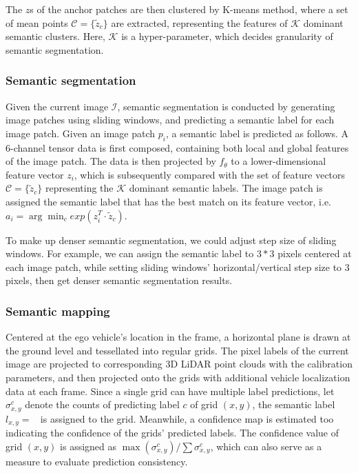 \documentclass[letterpaper, 10 pt, conference]{ieeeconf}  %
\begin{document}
The $z$s of the anchor patches are then clustered by K-means method, where a set of mean points $\mathcal{C}=\{\tilde{z}_c\}$ are extracted, representing the features of $\mathcal{K}$ dominant semantic clusters. Here, $\mathcal{K}$ is a hyper-parameter, which decides granularity of semantic segmentation.

\subsubsection{Semantic segmentation}

Given the current image $\mathcal{I}$, semantic segmentation is conducted by generating image patches using sliding windows, and predicting a semantic label for each image patch.
Given an image patch $p_i$, a semantic label is predicted as follows. A 6-channel tensor data is first composed, containing both local and global features of the image patch. The data is then projected by $f_{\theta}$ to a lower-dimensional feature vector $z_i$, which is subsequently compared with the set of feature vectors $\mathcal{C}=\{\tilde{z}_c\}$ representing the $\mathcal{K}$ dominant semantic labels. The image patch is assigned the semantic label that has the best match on its feature vector, i.e. $a_i = \arg\min_c exp(z_i^T \cdot \tilde{z}_c)$.

To make up denser semantic segmentation, we could adjust step size of sliding windows. For example, we can assign the semantic label to $3*3$ pixels centered at each image patch, while setting sliding windows' horizontal/vertical step size to 3 pixels, then get denser semantic segmentation results.

\subsubsection{Semantic mapping} \label{3_SM}

Centered at the ego vehicle's location in the frame, a horizontal plane is drawn at the ground level and tessellated into regular grids. The pixel labels of the current image are projected to corresponding 3D LiDAR point clouds with the calibration parameters, and then projected onto the grids with additional vehicle localization data at each frame. Since a single grid can have multiple label predictions, let $\sigma_{x,y}^c$ denote the counts of predicting label $c$ of grid $(x,y)$, the semantic label $l_{x,y}=\mathop{\text{argmax}_{c} (\sigma_{x,y}^c)}$ is assigned to the grid. Meanwhile, a confidence map is estimated too indicating the confidence of the grids' predicted labels. The confidence value of grid $(x,y)$ is assigned as $\max(\sigma_{x,y}^c)/\sum{\sigma_{x,y}^c}$, which can also serve as a measure to evaluate prediction consistency.
\end{document}
